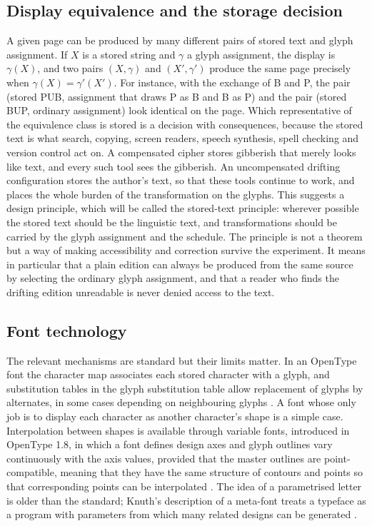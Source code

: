 \subsection{Display equivalence and the storage decision}

A given page can be produced by many different pairs of stored text and glyph assignment. If $X$ is a stored string and $\gamma$ a glyph assignment, the display is $\gamma(X)$, and two pairs $(X,\gamma)$ and $(X',\gamma')$ produce the same page precisely when $\gamma(X)=\gamma'(X')$. For instance, with the exchange of B and P, the pair (stored PUB, assignment that draws P as B and B as P) and the pair (stored BUP, ordinary assignment) look identical on the page. Which representative of the equivalence class is stored is a decision with consequences, because the stored text is what search, copying, screen readers, speech synthesis, spell checking and version control act on. A compensated cipher stores gibberish that merely looks like text, and every such tool sees the gibberish. An uncompensated drifting configuration stores the author's text, so that these tools continue to work, and places the whole burden of the transformation on the glyphs. This suggests a design principle, which will be called the stored-text principle: wherever possible the stored text should be the linguistic text, and transformations should be carried by the glyph assignment and the schedule. The principle is not a theorem but a way of making accessibility and correction survive the experiment. It means in particular that a plain edition can always be produced from the same source by selecting the ordinary glyph assignment, and that a reader who finds the drifting edition unreadable is never denied access to the text.

\subsection{Font technology}

The relevant mechanisms are standard but their limits matter. In an OpenType font the character map associates each stored character with a glyph, and substitution tables in the glyph substitution table allow replacement of glyphs by alternates, in some cases depending on neighbouring glyphs \citep{opentype}. A font whose only job is to display each character as another character's shape is a simple case. Interpolation between shapes is available through variable fonts, introduced in OpenType 1.8, in which a font defines design axes and glyph outlines vary continuously with the axis values, provided that the master outlines are point-compatible, meaning that they have the same structure of contours and points so that corresponding points can be interpolated \citep{opentype}. The idea of a parametrised letter is older than the standard; Knuth's description of a meta-font treats a typeface as a program with parameters from which many related designs can be generated \citep{knuth1982}.


